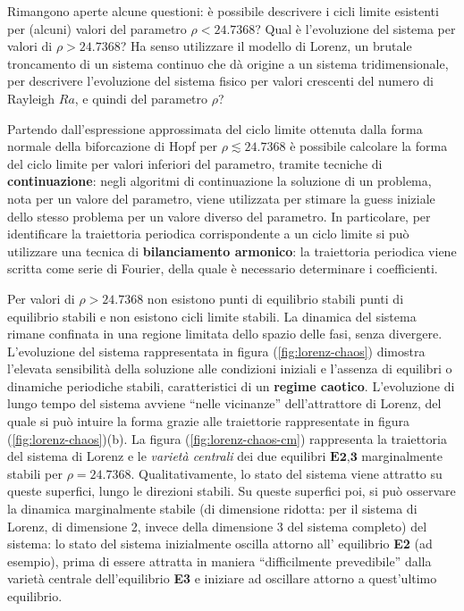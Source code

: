 \clearpage
\vspace{0.5cm}
\noindent
 Rimangono aperte alcune questioni: è possibile descrivere i cicli limite esistenti per (alcuni)
 valori del parametro $\rho < 24.7368$? Qual è l'evoluzione del sistema per valori
 di $\rho > 24.7368$? Ha senso utilizzare il modello di Lorenz, un brutale troncamento di
 un sistema continuo che dà origine a un sistema tridimensionale, per descrivere l'evoluzione
 del sistema fisico per valori crescenti del numero di Rayleigh $Ra$, e quindi del
 parametro $\rho$?

\vspace{0.3cm}
\noindent
Partendo dall'espressione approssimata del ciclo limite ottenuta dalla forma normale della
 biforcazione di Hopf per $\rho \lesssim 24.7368$ è possibile calcolare la forma del ciclo limite
 per valori inferiori del parametro, tramite tecniche di \textbf{continuazione}: negli algoritmi
 di continuazione la soluzione di un problema, nota per un valore del parametro, viene utilizzata
 per stimare la guess iniziale dello stesso problema per un valore diverso del parametro. 
In particolare, per identificare la traiettoria periodica corrispondente a un ciclo limite
 si può utilizzare una tecnica di \textbf{bilanciamento armonico}: la traiettoria periodica
 viene scritta come serie di Fourier, della quale è necessario determinare i coefficienti.

 
\vspace{0.3cm}
\noindent
Per valori di $\rho > 24.7368$ non esistono punti di equilibrio stabili punti di equilibrio
 stabili e non esistono cicli limite stabili. La dinamica del sistema rimane confinata 
 in una regione limitata dello spazio delle fasi, senza divergere.
L'evoluzione del sistema rappresentata in figura (\ref{fig:lorenz-chaos}) dimostra l'elevata
 sensibilità della soluzione alle condizioni 
 iniziali e l'assenza di equilibri o dinamiche periodiche stabili, caratteristici di un
 \textbf{regime caotico}. L'evoluzione di lungo tempo del sistema avviene ``nelle vicinanze''
 dell'attrattore di Lorenz, del quale si può intuire la forma grazie alle traiettorie
 rappresentate in figura (\ref{fig:lorenz-chaos})(b).
La figura (\ref{fig:lorenz-chaos-cm}) rappresenta la traiettoria del sistema di Lorenz e le
 \textit{varietà centrali} dei due equilibri $\textbf{E2,3}$ marginalmente stabili 
 per $\rho = 24.7368$. Qualitativamente, lo stato del sistema viene attratto su queste
 superfici, lungo le direzioni stabili. Su queste superfici poi, si può osservare la dinamica
 marginalmente stabile (di dimensione ridotta: per il sistema di Lorenz, di dimensione 2, invece
 della dimensione 3 del sistema completo) del sistema: lo stato del sistema inizialmente
 oscilla attorno all' equilibrio \textbf{E2} (ad esempio),
 prima di essere attratta in maniera ``difficilmente prevedibile''
 dalla varietà centrale dell'equilibrio \textbf{E3} e iniziare ad oscillare attorno a 
 quest'ultimo equilibrio.

